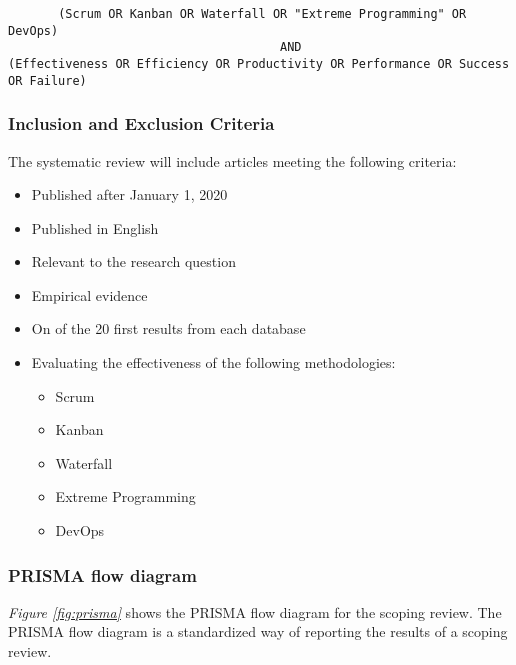 \documentclass[12pt]{article}
\begin{document}
\begin{adjustwidth}{-4em}{0pt}
\begin{verbatim}
       (Scrum OR Kanban OR Waterfall OR "Extreme Programming" OR DevOps) 
                                      AND
(Effectiveness OR Efficiency OR Productivity OR Performance OR Success OR Failure)
\end{verbatim}
\end{adjustwidth}

\subsubsection{Inclusion and Exclusion Criteria}
The systematic review will include articles meeting the following criteria:
\begin{itemize}
  \item Published after January 1, 2020
  \item Published in English
  \item Relevant to the research question
  \item Empirical evidence
  \item On of the 20 first results from each database
  \item Evaluating the effectiveness of the following methodologies:
  \begin{itemize}
    \item Scrum
    \item Kanban
    \item Waterfall
    \item Extreme Programming
    \item DevOps
  \end{itemize}
\end{itemize}

\subsubsection{PRISMA flow diagram}
\textit{Figure \ref{fig:prisma}} shows the PRISMA \cite{PRISMAStatement} flow diagram for the scoping review.
The PRISMA flow diagram is a standardized way of reporting the results of a scoping review.
\end{document}
